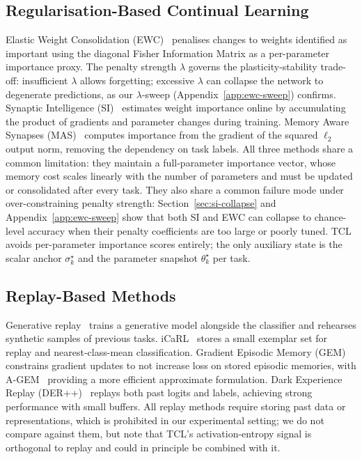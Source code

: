 \documentclass[10pt,a4paper]{article}
\begin{document}
\subsection{Regularisation-Based Continual Learning}

Elastic Weight Consolidation (EWC)~\cite{Kirkpatrick2017} penalises changes to
weights identified as important using the diagonal Fisher Information Matrix as a
per-parameter importance proxy.
The penalty strength $\lambda$ governs the plasticity-stability trade-off:
insufficient $\lambda$ allows forgetting; excessive $\lambda$ can collapse the
network to degenerate predictions, as our $\lambda$-sweep (Appendix~\ref{app:ewc-sweep})
confirms.
Synaptic Intelligence (SI)~\cite{Zenke2017} estimates weight importance online by
accumulating the product of gradients and parameter changes during training.
Memory Aware Synapses (MAS)~\cite{Aljundi2018} computes importance from the
gradient of the squared $\ell_2$ output norm, removing the dependency on task labels.
All three methods share a common limitation: they maintain a full-parameter importance
vector, whose memory cost scales linearly with the number of parameters and must be
updated or consolidated after every task.
They also share a common failure mode under over-constraining penalty strength:
Section~\ref{sec:si-collapse} and Appendix~\ref{app:ewc-sweep} show that both SI
and EWC can collapse to chance-level accuracy when their penalty coefficients are
too large or poorly tuned.
TCL avoids per-parameter importance scores entirely; the only auxiliary state is the
scalar anchor $\sigma^\star_k$ and the parameter snapshot $\theta^\star_k$ per task.

\subsection{Replay-Based Methods}

Generative replay~\cite{Shin2017} trains a generative model alongside the classifier
and rehearses synthetic samples of previous tasks.
iCaRL~\cite{Rebuffi2017} stores a small exemplar set for replay and nearest-class-mean
classification.
Gradient Episodic Memory (GEM)~\cite{LopezPaz2017} constrains gradient updates to
not increase loss on stored episodic memories, with A-GEM~\cite{Chaudhry2018}
providing a more efficient approximate formulation.
Dark Experience Replay (DER++)~\cite{Buzzega2020} replays both past logits and labels,
achieving strong performance with small buffers.
All replay methods require storing past data or representations, which is prohibited
in our experimental setting; we do not compare against them, but note that TCL's
activation-entropy signal is orthogonal to replay and could in principle be combined
with it.
\end{document}
